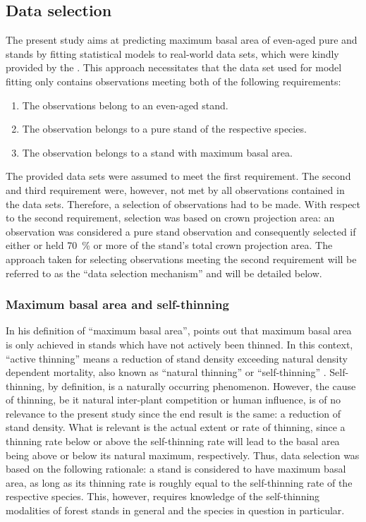 \subsection{Data selection}
The present study aims at predicting maximum basal area of even-aged pure \Beech{} and \Spruce{} stands by fitting statistical models to real-world data sets, which were kindly provided by the \NWFVA{}.  This approach necessitates that the data set used for model fitting only contains observations meeting both of the following requirements:
\begin{enumerate}
\item The observations belong to an even-aged stand.
\item The observation belongs to a pure stand of the respective species.
\item The observation belongs to a stand with maximum basal area.
\end{enumerate}
The provided data sets were assumed to meet the first requirement.  The second and third requirement were, however, not met by all observations contained in the data sets.  Therefore, a selection of observations had to be made.  With respect to the second requirement, selection was based on crown projection area: an observation was considered a pure stand observation and consequently selected if either \Beech{} or \Spruce{} held \SI{70}{\percent} or more of the stand’s total crown projection area.  The approach taken for selecting observations meeting the second requirement will be referred to as the ``data selection mechanism'' and will be detailed below.

\subsubsection{Maximum basal area and self-thinning}

In his definition of ``maximum basal area'', \textcite{Assmann1970} points out that maximum basal area is only achieved in stands which have not actively been thinned.  In this context, ``active thinning'' means a reduction of stand density exceeding natural density dependent mortality, also known as ``natural thinning'' \parencite{SAF1958} or ``self-thinning'' \parencite{Roehrig1992}.  Self-thinning, by definition, is a naturally occurring phenomenon.  However, the cause of thinning, be it natural inter-plant competition or human influence, is of no relevance to the present study since the end result is the same: a reduction of stand density.  What is relevant is the actual extent or rate of thinning, since a thinning rate below or above the self-thinning rate will lead to the basal area being above or below its natural maximum, respectively.  Thus, data selection was based on the following rationale:  a stand is considered to have maximum basal area, as long as its thinning rate is roughly equal to the self-thinning rate of the respective species.  This, however, requires knowledge of the self-thinning modalities of forest stands in general and the species in question in particular.

